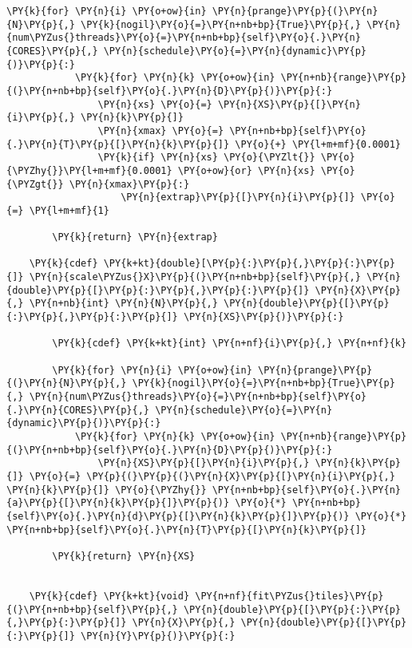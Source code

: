 \begin{Verbatim}[commandchars=\\\{\}]
        \PY{k}{for} \PY{n}{i} \PY{o+ow}{in} \PY{n}{prange}\PY{p}{(}\PY{n}{N}\PY{p}{,} \PY{k}{nogil}\PY{o}{=}\PY{n+nb+bp}{True}\PY{p}{,} \PY{n}{num\PYZus{}threads}\PY{o}{=}\PY{n+nb+bp}{self}\PY{o}{.}\PY{n}{CORES}\PY{p}{,} \PY{n}{schedule}\PY{o}{=}\PY{n}{dynamic}\PY{p}{)}\PY{p}{:}
            \PY{k}{for} \PY{n}{k} \PY{o+ow}{in} \PY{n+nb}{range}\PY{p}{(}\PY{n+nb+bp}{self}\PY{o}{.}\PY{n}{D}\PY{p}{)}\PY{p}{:}
                \PY{n}{xs} \PY{o}{=} \PY{n}{XS}\PY{p}{[}\PY{n}{i}\PY{p}{,} \PY{n}{k}\PY{p}{]}
                \PY{n}{xmax} \PY{o}{=} \PY{n+nb+bp}{self}\PY{o}{.}\PY{n}{T}\PY{p}{[}\PY{n}{k}\PY{p}{]} \PY{o}{+} \PY{l+m+mf}{0.0001}
                \PY{k}{if} \PY{n}{xs} \PY{o}{\PYZlt{}} \PY{o}{\PYZhy{}}\PY{l+m+mf}{0.0001} \PY{o+ow}{or} \PY{n}{xs} \PY{o}{\PYZgt{}} \PY{n}{xmax}\PY{p}{:}
                    \PY{n}{extrap}\PY{p}{[}\PY{n}{i}\PY{p}{]} \PY{o}{=} \PY{l+m+mf}{1}

        \PY{k}{return} \PY{n}{extrap}

    \PY{k}{cdef} \PY{k+kt}{double}[\PY{p}{:}\PY{p}{,}\PY{p}{:}\PY{p}{]} \PY{n}{scale\PYZus{}X}\PY{p}{(}\PY{n+nb+bp}{self}\PY{p}{,} \PY{n}{double}\PY{p}{[}\PY{p}{:}\PY{p}{,}\PY{p}{:}\PY{p}{]} \PY{n}{X}\PY{p}{,} \PY{n+nb}{int} \PY{n}{N}\PY{p}{,} \PY{n}{double}\PY{p}{[}\PY{p}{:}\PY{p}{,}\PY{p}{:}\PY{p}{]} \PY{n}{XS}\PY{p}{)}\PY{p}{:}

        \PY{k}{cdef} \PY{k+kt}{int} \PY{n+nf}{i}\PY{p}{,} \PY{n+nf}{k}

        \PY{k}{for} \PY{n}{i} \PY{o+ow}{in} \PY{n}{prange}\PY{p}{(}\PY{n}{N}\PY{p}{,} \PY{k}{nogil}\PY{o}{=}\PY{n+nb+bp}{True}\PY{p}{,} \PY{n}{num\PYZus{}threads}\PY{o}{=}\PY{n+nb+bp}{self}\PY{o}{.}\PY{n}{CORES}\PY{p}{,} \PY{n}{schedule}\PY{o}{=}\PY{n}{dynamic}\PY{p}{)}\PY{p}{:}
            \PY{k}{for} \PY{n}{k} \PY{o+ow}{in} \PY{n+nb}{range}\PY{p}{(}\PY{n+nb+bp}{self}\PY{o}{.}\PY{n}{D}\PY{p}{)}\PY{p}{:}
                \PY{n}{XS}\PY{p}{[}\PY{n}{i}\PY{p}{,} \PY{n}{k}\PY{p}{]} \PY{o}{=} \PY{p}{(}\PY{p}{(}\PY{n}{X}\PY{p}{[}\PY{n}{i}\PY{p}{,} \PY{n}{k}\PY{p}{]} \PY{o}{\PYZhy{}} \PY{n+nb+bp}{self}\PY{o}{.}\PY{n}{a}\PY{p}{[}\PY{n}{k}\PY{p}{]}\PY{p}{)} \PY{o}{*} \PY{n+nb+bp}{self}\PY{o}{.}\PY{n}{d}\PY{p}{[}\PY{n}{k}\PY{p}{]}\PY{p}{)} \PY{o}{*} \PY{n+nb+bp}{self}\PY{o}{.}\PY{n}{T}\PY{p}{[}\PY{n}{k}\PY{p}{]}

        \PY{k}{return} \PY{n}{XS}
         

    \PY{k}{cdef} \PY{k+kt}{void} \PY{n+nf}{fit\PYZus{}tiles}\PY{p}{(}\PY{n+nb+bp}{self}\PY{p}{,} \PY{n}{double}\PY{p}{[}\PY{p}{:}\PY{p}{,}\PY{p}{:}\PY{p}{]} \PY{n}{X}\PY{p}{,} \PY{n}{double}\PY{p}{[}\PY{p}{:}\PY{p}{]} \PY{n}{Y}\PY{p}{)}\PY{p}{:}
    

\end{Verbatim}
